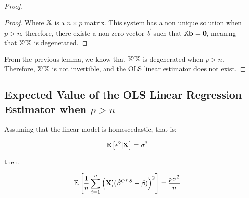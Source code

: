 \begin{claim*}
\begin{proof}
\begin{lemma*}
\begin{proof}
                Where $\mathbb{X}$ is a $n \times p$ matrix. This system has a non unique solution when $p > n$. therefore, there existe a non-zero vector $\Vec{b}$ such that $\mathbb{X}\mathbf{b} = \mathbf{0}$, meaning that $\mathbb{X}'\mathbb{X}$ is degenerated.
            \end{proof}
        \end{lemma*}

        From the previous lemma, we know that $\mathbb{X}'\mathbb{X}$ is degenerated when $p > n$. Therefore, $\mathbb{X}'\mathbb{X}$ is not invertible, and the OLS linear estimator does not exist.
    \end{proof}
\end{claim*}

\subsection{Expected Value of the OLS Linear Regression Estimator when $p > n$}

Assuming that the linear model is homoscedastic, that is: 

\begin{align*}
    \mathbb{E}\left[\epsilon^2 | \mathbf{X}\right] = \sigma^2
\end{align*}

then: 

\begin{align*}
\mathbb{E}\left[
    \frac{1}{n}
    \sum_{i=1}^{n} \left(\mathbf{X}_i' 
        (\hat{\beta}^{OLS} - \beta)
    \right)^2
\right]
=
\dfrac{p \sigma^2}{n}
\end{align*}

